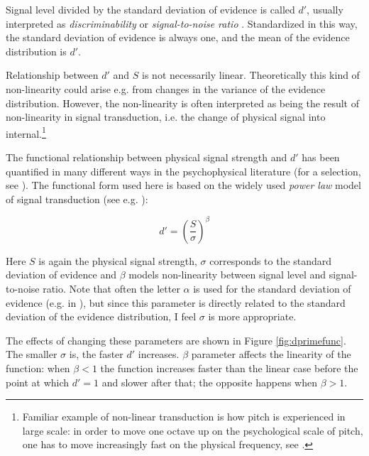 \documentclass{article}\usepackage{knitr}
\begin{document}
Signal level divided by the standard deviation of evidence is called $d'$, usually interpreted as \textit{discriminability} \citep[Chapter 6]{kingdomprins2010} or \textit{signal-to-noise ratio} \citep{kontsevichtyler1999}. Standardized in this way, the standard deviation of evidence is always one, and the mean of the evidence distribution is $d'$.

Relationship between $d'$ and $S$ is not necessarily linear. Theoretically this kind of non-linearity could  arise e.g. from changes in the variance of the evidence distribution. However, the non-linearity is often interpreted as being the result of non-linearity in signal transduction, i.e. the change of physical signal into internal.\footnote{Familiar example of non-linear transduction is how pitch is experienced in large scale: in order to move one octave up on the psychological scale of pitch, one has to move increasingly fast on the physical frequency, see \citet[Chapter 5]{zwickerfastl}.}

The functional relationship between physical signal strength and $d'$ has been quantified in many different ways in the psychophysical literature (for a selection, see \citet[Appendix A]{lesmes2015}). The functional form used here is based on the widely used \textit{power law} model of signal transduction (see e.g. \citet{kontsevichtyler1999, dai2011, lesmes2015}):

\begin{equation}
d' = (\frac{S}{\sigma})^\beta
\label{eq:dprimefunc}
\end{equation}

Here $S$ is again the physical signal strength, $\sigma$ corresponds to the standard deviation of evidence and $\beta$ models non-linearity between signal level and signal-to-noise ratio. Note that often the letter $\alpha$ is used for the standard deviation of evidence (e.g. in \cite{dai2011, kontsevichtyler1999, kingdomprins2010}), but since this parameter is directly related to the standard deviation of the evidence distribution, I feel $\sigma$ is more appropriate. 

The effects of changing these parameters are shown in Figure \ref{fig:dprimefunc}. The smaller $\sigma$ is, the faster $d'$ increases. $\beta$ parameter affects the linearity of the function: when $\beta < 1$ the function increases faster than the linear case before the point at which $d' = 1$ and slower after that; the opposite happens when $\beta > 1$. 
\end{document}
